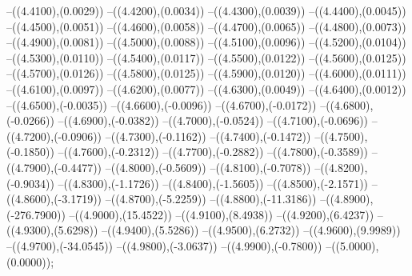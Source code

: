 {	--({\sx*(4.4100)},{\sy*(0.0029)})
	--({\sx*(4.4200)},{\sy*(0.0034)})
	--({\sx*(4.4300)},{\sy*(0.0039)})
	--({\sx*(4.4400)},{\sy*(0.0045)})
	--({\sx*(4.4500)},{\sy*(0.0051)})
	--({\sx*(4.4600)},{\sy*(0.0058)})
	--({\sx*(4.4700)},{\sy*(0.0065)})
	--({\sx*(4.4800)},{\sy*(0.0073)})
	--({\sx*(4.4900)},{\sy*(0.0081)})
	--({\sx*(4.5000)},{\sy*(0.0088)})
	--({\sx*(4.5100)},{\sy*(0.0096)})
	--({\sx*(4.5200)},{\sy*(0.0104)})
	--({\sx*(4.5300)},{\sy*(0.0110)})
	--({\sx*(4.5400)},{\sy*(0.0117)})
	--({\sx*(4.5500)},{\sy*(0.0122)})
	--({\sx*(4.5600)},{\sy*(0.0125)})
	--({\sx*(4.5700)},{\sy*(0.0126)})
	--({\sx*(4.5800)},{\sy*(0.0125)})
	--({\sx*(4.5900)},{\sy*(0.0120)})
	--({\sx*(4.6000)},{\sy*(0.0111)})
	--({\sx*(4.6100)},{\sy*(0.0097)})
	--({\sx*(4.6200)},{\sy*(0.0077)})
	--({\sx*(4.6300)},{\sy*(0.0049)})
	--({\sx*(4.6400)},{\sy*(0.0012)})
	--({\sx*(4.6500)},{\sy*(-0.0035)})
	--({\sx*(4.6600)},{\sy*(-0.0096)})
	--({\sx*(4.6700)},{\sy*(-0.0172)})
	--({\sx*(4.6800)},{\sy*(-0.0266)})
	--({\sx*(4.6900)},{\sy*(-0.0382)})
	--({\sx*(4.7000)},{\sy*(-0.0524)})
	--({\sx*(4.7100)},{\sy*(-0.0696)})
	--({\sx*(4.7200)},{\sy*(-0.0906)})
	--({\sx*(4.7300)},{\sy*(-0.1162)})
	--({\sx*(4.7400)},{\sy*(-0.1472)})
	--({\sx*(4.7500)},{\sy*(-0.1850)})
	--({\sx*(4.7600)},{\sy*(-0.2312)})
	--({\sx*(4.7700)},{\sy*(-0.2882)})
	--({\sx*(4.7800)},{\sy*(-0.3589)})
	--({\sx*(4.7900)},{\sy*(-0.4477)})
	--({\sx*(4.8000)},{\sy*(-0.5609)})
	--({\sx*(4.8100)},{\sy*(-0.7078)})
	--({\sx*(4.8200)},{\sy*(-0.9034)})
	--({\sx*(4.8300)},{\sy*(-1.1726)})
	--({\sx*(4.8400)},{\sy*(-1.5605)})
	--({\sx*(4.8500)},{\sy*(-2.1571)})
	--({\sx*(4.8600)},{\sy*(-3.1719)})
	--({\sx*(4.8700)},{\sy*(-5.2259)})
	--({\sx*(4.8800)},{\sy*(-11.3186)})
	--({\sx*(4.8900)},{\sy*(-276.7900)})
	--({\sx*(4.9000)},{\sy*(15.4522)})
	--({\sx*(4.9100)},{\sy*(8.4938)})
	--({\sx*(4.9200)},{\sy*(6.4237)})
	--({\sx*(4.9300)},{\sy*(5.6298)})
	--({\sx*(4.9400)},{\sy*(5.5286)})
	--({\sx*(4.9500)},{\sy*(6.2732)})
	--({\sx*(4.9600)},{\sy*(9.9989)})
	--({\sx*(4.9700)},{\sy*(-34.0545)})
	--({\sx*(4.9800)},{\sy*(-3.0637)})
	--({\sx*(4.9900)},{\sy*(-0.7800)})
	--({\sx*(5.0000)},{\sy*(0.0000)});
}
\def\xwerteh{
\fill[color=red] (0.0000,0) circle[radius={0.07/\skala}];
\fill[color=red] (0.3125,0) circle[radius={0.07/\skala}];
\fill[color=red] (0.6250,0) circle[radius={0.07/\skala}];
\fill[color=red] (0.9375,0) circle[radius={0.07/\skala}];
\fill[color=red] (1.2500,0) circle[radius={0.07/\skala}];
\fill[color=red] (1.5625,0) circle[radius={0.07/\skala}];
\fill[color=red] (1.8750,0) circle[radius={0.07/\skala}];
\fill[color=red] (2.1875,0) circle[radius={0.07/\skala}];
\fill[color=red] (2.5000,0) circle[radius={0.07/\skala}];
\fill[color=red] (2.8125,0) circle[radius={0.07/\skala}];
\fill[color=red] (3.1250,0) circle[radius={0.07/\skala}];
\fill[color=red] (3.4375,0) circle[radius={0.07/\skala}];
\fill[color=red] (3.7500,0) circle[radius={0.07/\skala}];
\fill[color=red] (4.0625,0) circle[radius={0.07/\skala}];
\fill[color=red] (4.3750,0) circle[radius={0.07/\skala}];
\fill[color=red] (4.6875,0) circle[radius={0.07/\skala}];
\fill[color=red] (5.0000,0) circle[radius={0.07/\skala}];
}
